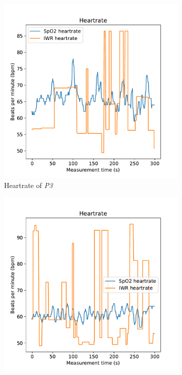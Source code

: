 \begin{figure}[t]
\centering
\begin{subfigure}{.45\textwidth}
  \centering
  \includegraphics[width=\linewidth]{figures/validation/roy4_heart.pdf}  
  \caption{Heartrate of \emph{P3}}
  \label{fig:roy4_heart}
\end{subfigure}
\begin{subfigure}{.45\textwidth}
  \centering
  \includegraphics[width=\linewidth]{figures/validation/nick4_heart.pdf}  

\end{subfigure}
\end{figure}
